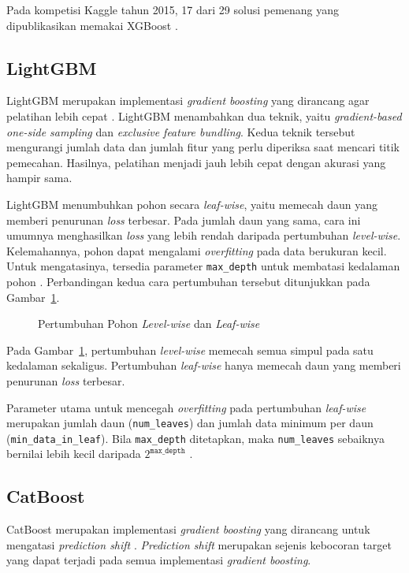 Pada kompetisi Kaggle tahun 2015, 17 dari 29 solusi pemenang
yang dipublikasikan memakai XGBoost \cite{chen2016}.

\subsection{LightGBM}
LightGBM merupakan implementasi \textit{gradient boosting} yang dirancang agar
pelatihan lebih cepat \cite{ke2017}. LightGBM menambahkan dua teknik, yaitu
\textit{gradient-based one-side sampling} dan \textit{exclusive feature
bundling}. Kedua teknik tersebut mengurangi jumlah data dan jumlah fitur yang
perlu diperiksa saat mencari titik pemecahan. Hasilnya, pelatihan menjadi jauh
lebih cepat dengan akurasi yang hampir sama.

LightGBM menumbuhkan pohon secara \textit{leaf-wise}, yaitu memecah daun yang
memberi penurunan \textit{loss} terbesar. Pada jumlah daun yang sama, cara ini
umumnya menghasilkan \textit{loss} yang lebih rendah daripada pertumbuhan
\textit{level-wise}. Kelemahannya, pohon dapat mengalami \textit{overfitting}
pada data berukuran kecil. Untuk mengatasinya, tersedia parameter \texttt{max\_depth}
untuk membatasi kedalaman pohon \cite{lightgbmfeatures}.
Perbandingan kedua cara pertumbuhan tersebut ditunjukkan pada Gambar~\ref{fig:leafwise}.

\begin{figure}[!htbp]
  \centering
  \caption[Pertumbuhan Pohon \textit{Level-wise} dan
    \textit{Leaf-wise}]{Pertumbuhan Pohon \textit{Level-wise} dan
    \textit{Leaf-wise} \cite{lightgbmfeatures}}
  \label{fig:leafwise}
\end{figure}
Pada Gambar~\ref{fig:leafwise}, pertumbuhan \textit{level-wise} memecah semua
simpul pada satu kedalaman sekaligus. Pertumbuhan \textit{leaf-wise} hanya
memecah daun yang memberi penurunan \textit{loss} terbesar.

Parameter utama untuk mencegah \textit{overfitting} pada pertumbuhan
\textit{leaf-wise} merupakan jumlah daun (\texttt{num\_leaves}) dan jumlah
data minimum per daun (\texttt{min\_data\_in\_leaf}).
Bila \texttt{max\_depth} ditetapkan, maka \texttt{num\_leaves} sebaiknya
bernilai lebih kecil daripada $2^{\texttt{max\_depth}}$ \cite{lightgbmtuning}.

\subsection{CatBoost}
\label{subsec:catboost}
CatBoost merupakan implementasi \textit{gradient boosting} yang dirancang
untuk mengatasi \textit{prediction shift} \cite{prokhorenkova2018}.
\textit{Prediction shift} merupakan sejenis kebocoran target yang dapat
terjadi pada semua implementasi \textit{gradient boosting}.

